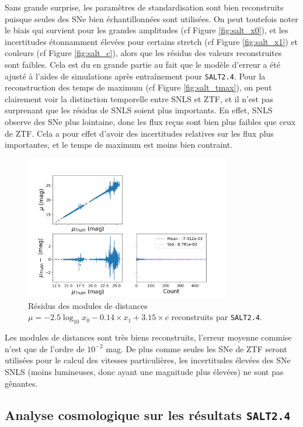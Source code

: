 \documentclass{book}
\def\saltd{\texttt{SALT2.4}\xspace}
\begin{document}
Sans grande surprise, les paramètres de standardisation sont bien reconstruits puisque seules des SNe bien échantillonnées sont utilisées. On peut toutefois noter le biais qui survient pour les grandes amplitudes (cf Figure \ref{fig:salt_x0}), et les incertitudes étonnamment élevées pour certains stretch (cf Figure \ref{fig:salt_x1}) et couleurs (cf Figure \ref{fig:salt_c}), alors que les résidus des valeurs reconstruites sont faibles. Cela est du en grande partie au fait que le modèle d'erreur a été ajusté à l'aides de simulations après entraînement pour \saltd. Pour la reconstruction des temps de maximum (cf Figure \ref{fig:salt_tmax}), on peut clairement voir la distinction temporelle entre SNLS et ZTF, et il n'est pas surprenant que les résidus de SNLS soient plus importants. En effet, SNLS observe des SNe plus lointaine, donc les flux reçus sont bien plus faibles que ceux de ZTF. Cela a pour effet d'avoir des incertitudes relatives sur les flux plus importantes, et le temps de maximum est moins bien contraint.

\begin{figure}[h]
    \centering
    \includegraphics[width=0.8\textwidth]{figures/salt_mu.png}
    \caption{Résidus des modules de distances $\mu = -2.5\log_{10} x_0 - 0.14 \times x_1 + 3.15 \times  c$ reconstruits par \saltd.}
    \label{fig:salt_mu}
\end{figure}

Les modules de distances sont très biens reconstruits, l'erreur moyenne commise n'est que de l'ordre de $10^{-2}$ mag. De plus comme seules les SNe de ZTF seront utilisées pour le calcul des vitesses particulières, les incertitudes élevées des SNe SNLS (moins lumineuses, donc ayant une magnitude plus élevées) ne sont pas gênantes.

\subsection{Analyse cosmologique sur les résultats \saltd}
\end{document}
